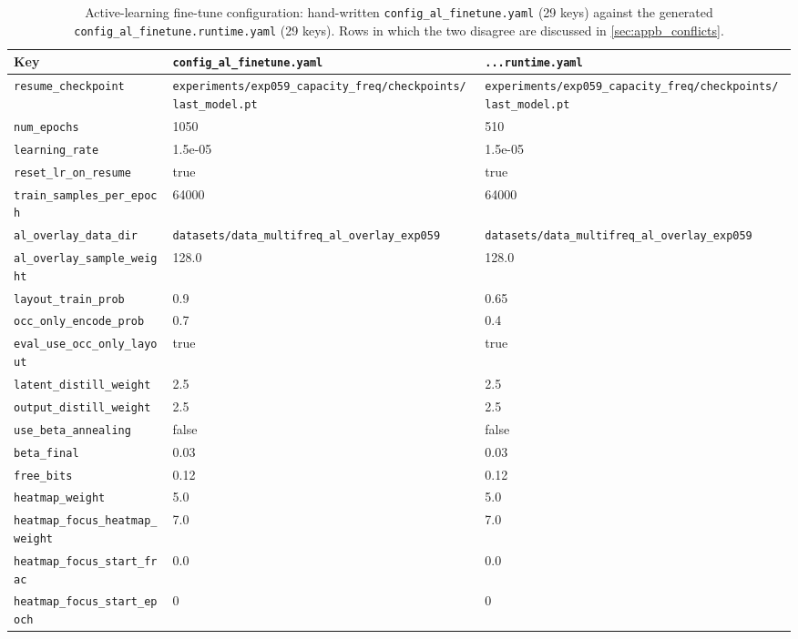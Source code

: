 \begin{table}[htbp]
\centering
\small
\caption{Active-learning fine-tune configuration: hand-written
\texttt{config\_al\_finetune.yaml} (29 keys) against the generated
\texttt{config\_al\_finetune.runtime.yaml} (29 keys). Rows in which the two disagree are
discussed in \autoref{sec:appb_conflicts}.}
\label{tab:appb_al_finetune}
\begin{tabular}{@{}lp{}p{}@{}}
\hline
Key & \texttt{config\_al\_finetune.yaml} & \texttt{...runtime.yaml} \\
\hline
\texttt{resume\_checkpoint} & \texttt{experiments/\allowbreak exp059\_capacity\_freq/\allowbreak checkpoints/\allowbreak last\_model.pt} & \texttt{experiments/\allowbreak exp059\_capacity\_freq/\allowbreak checkpoints/\allowbreak last\_model.pt} \\
\texttt{num\_epochs} & 1050 & 510 \\
\texttt{learning\_rate} & 1.5e-05 & 1.5e-05 \\
\texttt{reset\_lr\_on\_resume} & true & true \\
\texttt{train\_samples\_per\_epoch} & 64000 & 64000 \\
\texttt{al\_overlay\_data\_dir} & \texttt{datasets/\allowbreak data\_multifreq\_\allowbreak al\_overlay\_exp059} & \texttt{datasets/\allowbreak data\_multifreq\_\allowbreak al\_overlay\_exp059} \\
\texttt{al\_overlay\_sample\_weight} & 128.0 & 128.0 \\
\texttt{layout\_train\_prob} & 0.9 & 0.65 \\
\texttt{occ\_only\_encode\_prob} & 0.7 & 0.4 \\
\texttt{eval\_use\_occ\_only\_layout} & true & true \\
\texttt{latent\_distill\_weight} & 2.5 & 2.5 \\
\texttt{output\_distill\_weight} & 2.5 & 2.5 \\
\texttt{use\_beta\_annealing} & false & false \\
\texttt{beta\_final} & 0.03 & 0.03 \\
\texttt{free\_bits} & 0.12 & 0.12 \\
\texttt{heatmap\_weight} & 5.0 & 5.0 \\
\texttt{heatmap\_focus\_heatmap\_weight} & 7.0 & 7.0 \\
\texttt{heatmap\_focus\_start\_frac} & 0.0 & 0.0 \\
\texttt{heatmap\_focus\_start\_epoch} & 0 & 0 \\

\end{tabular}
\end{table}
